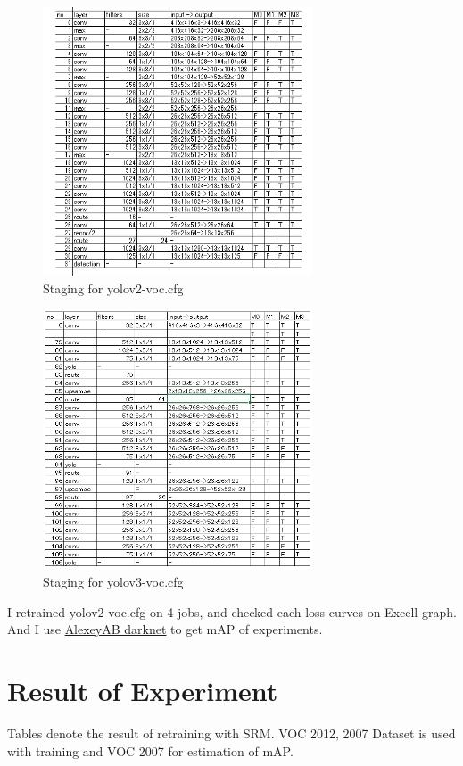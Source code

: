 \documentclass[10pt,a4paper,twocolumn]{article}
\begin{document}
\begin{figure}
\includegraphics[width=8cm]{YOLOV2VOCSTAGES.PNG}
\caption{Staging for yolov2-voc.cfg}
\end{figure}

\begin{figure}
\includegraphics[width=8cm]{YOLOV3VOCSTAGES.PNG}
\caption{Staging for yolov3-voc.cfg}
\end{figure}

I retrained yolov2-voc.cfg on 4 jobs, and checked each loss curves on Excell graph.
And I use \href{https://github.com/AlexeyAB/darknet}{AlexeyAB darknet} to get mAP of experiments.

\section{Result of Experiment}

Tables denote the result of retraining with SRM.
VOC 2012, 2007 Dataset is used with training and VOC 2007 for estimation of mAP.
\end{document}
